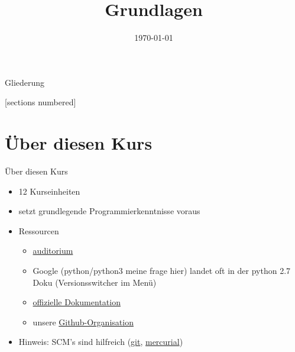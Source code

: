 



\title{Grundlagen}
\date{\today}




\maketitle

\begin{frame}{Gliederung}
	\begin{multicols}{2}
		[sections numbered]
		\tableofcontents
	\end{multicols}
\end{frame}

\section{Über diesen Kurs}
\begin{frame}{Über diesen Kurs}
	\begin{itemize}
    	\item 12 Kurseinheiten
    	\item setzt grundlegende Programmierkenntnisse voraus
    	\item Ressourcen
    	\begin{itemize}
    	    \item \href{http://auditorium.inf.tu-dresden.de}{auditorium} %
	        \item Google (python/python3 meine frage hier) landet oft in der python 2.7 Doku (Versionsswitcher im Menü)
    	    \item \href{https://docs.python.org}{offizielle Dokumentation}
    	    \item unsere \href{https://github.com/fsr}{Github-Organisation}
    	\end{itemize}
    	\item Hinweis: SCM's sind hilfreich (\href{https://git-scm.com}{git}, \href{http://mercurial.selenic.com/}{mercurial})
	\end{itemize}
\end{frame}


